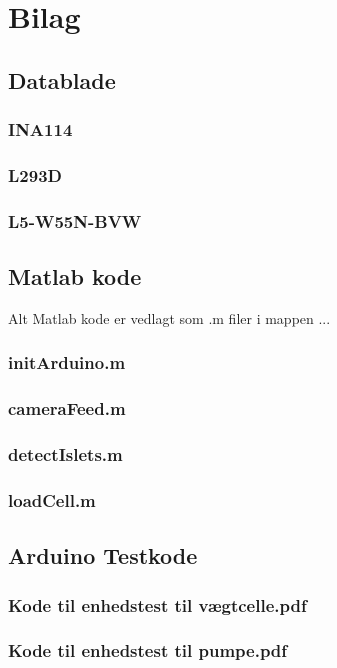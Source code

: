 \chapter{Bilag}
\section{Datablade}
\subsection{INA114}
\label{bilag:INA114}
\subsection{L293D}
\label{bilag:L293D}
\subsection{L5-W55N-BVW}
\label{bilag:L5-W55N-BVW}
\section{Matlab kode}
Alt Matlab kode er vedlagt som .m filer i mappen ... 
\subsection{initArduino.m} \label{bilag:initArduino}
\subsection{cameraFeed.m} \label{bilag:cameraFeed}
\subsection{detectIslets.m}
\subsection{loadCell.m}
\section{Arduino Testkode}
\subsection{Kode til enhedstest til vægtcelle.pdf} 
\label{bilag:TKloadcell}
\subsection{Kode til enhedstest til pumpe.pdf}
\label{bilag:TKpumpe}
